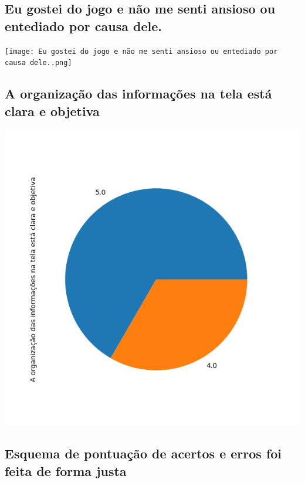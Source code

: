 \documentclass[12pt]{article}
\begin{document}
\subsection{Eu gostei do jogo e não me senti ansioso ou entediado por causa dele.}

\begin{center}
  \texttt{[image: Eu gostei do jogo e não me senti ansioso ou entediado por causa dele..png]}
\end{center}

\subsection{A organização das informações na tela está clara e objetiva}

\begin{center}
  \includegraphics[scale=0.4]{A organização das informações na tela está clara e objetiva.png}
\end{center}

\subsection{Esquema de pontuação de acertos e erros foi feita de forma justa}
\end{document}
